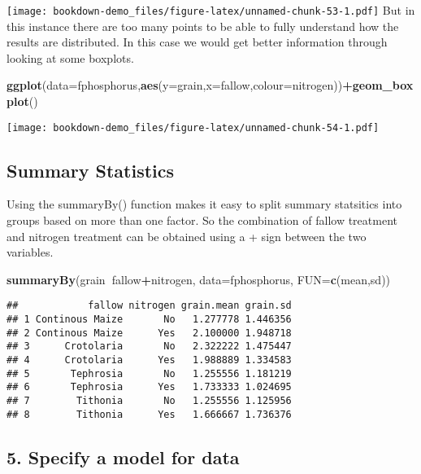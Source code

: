 \documentclass[]{book}
\newenvironment{Shaded}{\begin{snugshade}}{\end{snugshade}}
\newcommand{\KeywordTok}[1]{\textcolor[rgb]{0.13,0.29,0.53}{\textbf{#1}}}
\newcommand{\DataTypeTok}[1]{\textcolor[rgb]{0.13,0.29,0.53}{#1}}
\newcommand{\OperatorTok}[1]{\textcolor[rgb]{0.81,0.36,0.00}{\textbf{#1}}}
\newcommand{\NormalTok}[1]{#1}
\theoremstyle{definition}
\theoremstyle{definition}
\theoremstyle{definition}
\theoremstyle{remark}
\begin{document}
\texttt{[image: bookdown-demo\_files/figure-latex/unnamed-chunk-53-1.pdf]}
But in this instance there are too many points to be able to fully
understand how the results are distributed. In this case we would get
better information through looking at some boxplots.

\begin{Shaded}
\begin{Highlighting}[]
\KeywordTok{ggplot}\NormalTok{(}\DataTypeTok{data=}\NormalTok{fphosphorus,}\KeywordTok{aes}\NormalTok{(}\DataTypeTok{y=}\NormalTok{grain,}\DataTypeTok{x=}\NormalTok{fallow,}\DataTypeTok{colour=}\NormalTok{nitrogen))}\OperatorTok{+}\KeywordTok{geom_boxplot}\NormalTok{()}
\end{Highlighting}
\end{Shaded}

\texttt{[image: bookdown-demo\_files/figure-latex/unnamed-chunk-54-1.pdf]}

\subsection{Summary Statistics}\label{summary-statistics-1}

Using the summaryBy() function makes it easy to split summary statsitics
into groups based on more than one factor. So the combination of fallow
treatment and nitrogen treatment can be obtained using a + sign between
the two variables.

\begin{Shaded}
\begin{Highlighting}[]
\KeywordTok{summaryBy}\NormalTok{(grain}\OperatorTok{~}\NormalTok{fallow}\OperatorTok{+}\NormalTok{nitrogen, }\DataTypeTok{data=}\NormalTok{fphosphorus, }\DataTypeTok{FUN=}\KeywordTok{c}\NormalTok{(mean,sd))}
\end{Highlighting}
\end{Shaded}

\begin{verbatim}
##            fallow nitrogen grain.mean grain.sd
## 1 Continous Maize       No   1.277778 1.446356
## 2 Continous Maize      Yes   2.100000 1.948718
## 3      Crotolaria       No   2.322222 1.475447
## 4      Crotolaria      Yes   1.988889 1.334583
## 5       Tephrosia       No   1.255556 1.181219
## 6       Tephrosia      Yes   1.733333 1.024695
## 7        Tithonia       No   1.255556 1.125956
## 8        Tithonia      Yes   1.666667 1.736376
\end{verbatim}

\subsection{5. Specify a model for
data}\label{specify-a-model-for-data-1}
\end{document}
